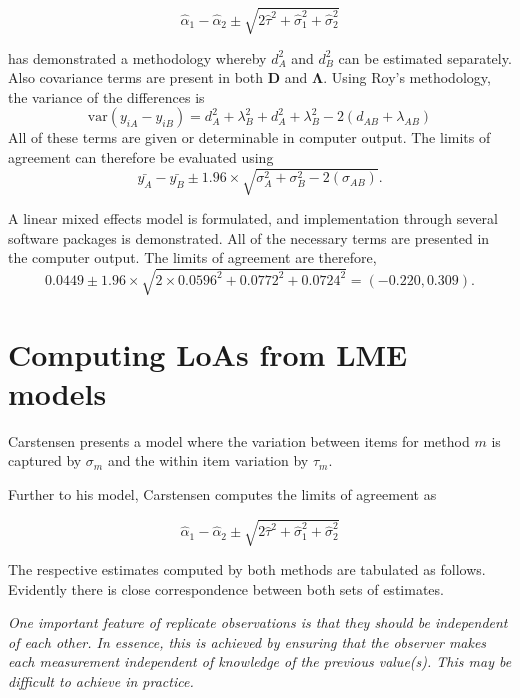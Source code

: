 \documentclass[12pt, a4paper]{report}
\theoremstyle{plain}
\theoremstyle{definition}
\theoremstyle{remark}
\begin{document}
\[
\hat{\alpha}_1 - \hat{\alpha}_2 \pm \sqrt{2 \hat{\tau}^2 +
	\hat{\sigma}^2_1 + \hat{\sigma}^2_2}
\]





\citet{ARoy2009} has demonstrated a methodology whereby $d^2_{A}$ and $d^2_{B}$ can be estimated separately. Also covariance terms are present in both $\boldsymbol{D}$ and $\boldsymbol{\Lambda}$. Using Roy's methodology, the variance of the differences is
\begin{equation}
\mbox{var} (y_{iA}-y_{iB})= d^2_{A} + \lambda^2_{B} + d^2_{A} + \lambda^2_{B} - 2(d_{AB} + \lambda_{AB})
\end{equation}
All of these terms are given or determinable in computer output.
The limits of agreement can therefore be evaluated using
\begin{equation}
\bar{y_{A}}-\bar{y_{B}} \pm 1.96 \times \sqrt{ \sigma^2_{A} + \sigma^2_{B}  - 2(\sigma_{AB})}.
\end{equation}

A linear mixed effects model is formulated, and implementation through several software packages is demonstrated.
All of the necessary terms are presented in the computer output. The limits of agreement are therefore,
\begin{equation}
0.0449  \pm 1.96 \times  \sqrt{2 \times 0.0596^2 + 0.0772^2 + 0.0724^2} = (-0.220,  0.309).
\end{equation}

\section{Computing LoAs from LME models}

Carstensen presents a model where the variation between items for method $m$ is captured by $\sigma_m$ and the within item variation by $\tau_m$.

Further to his model, Carstensen computes the limits of agreement
as

\[
\hat{\alpha}_1 - \hat{\alpha}_2 \pm \sqrt{2 \hat{\tau}^2 +
	\hat{\sigma}^2_1 + \hat{\sigma}^2_2}
\]

The respective estimates computed by both methods are tabulated as follows. Evidently there is close correspondence between both sets of estimates.


\emph{
	One important feature of replicate observations is that they should be independent
	of each other. In essence, this is achieved by ensuring that the observer makes each
	measurement independent of knowledge of the previous value(s). This may be difficult
	to achieve in practice.}
\end{document}
